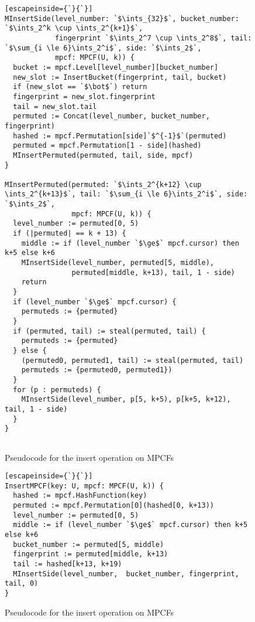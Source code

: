 \documentclass[letterpaper, 11pt]{article}
\newcommand{\ints}{\mathbb{Z}}
\begin{document}
\begin{figure}
\begin{lstlisting}[escapeinside={`}{`}]
MInsertSide(level_number: `$\ints_{32}$`, bucket_number: `$\ints_2^k \cup \ints_2^{k+1}$`,
            fingerprint `$\ints_2^7 \cup \ints_2^8$`, tail: `$\sum_{i \le 6}\ints_2^i$`, side: `$\ints_2$`,
            mpcf: MPCF(U, k)) {
  bucket := mpcf.Level[level_number][bucket_number]
  new_slot := InsertBucket(fingerprint, tail, bucket)
  if (new_slot == `$\bot$`) return
  fingerprint = new_slot.fingerprint
  tail = new_slot.tail
  permuted := Concat(level_number, bucket_number, fingerprint)
  hashed := mpcf.Permutation[side]`$^{-1}$`(permuted)
  permuted = mpcf.Permutation[1 - side](hashed)
  MInsertPermuted(permuted, tail, side, mpcf)
}

MInsertPermuted(permuted: `$\ints_2^{k+12} \cup \ints_2^{k+13}$`, tail: `$\sum_{i \le 6}\ints_2^i$`, side: `$\ints_2$`,
                mpcf: MPCF(U, k)) {
  level_number := permuted[0, 5)
  if (|permuted| == k + 13) {
    middle := if (level_number `$\ge$` mpcf.cursor) then k+5 else k+6
    MInsertSide(level_number, permuted[5, middle),
                permuted[middle, k+13), tail, 1 - side)
    return
  }
  if (level_number `$\ge$` mpcf.cursor) {
    permuteds := {permuted}
  }
  if (permuted, tail) := steal(permuted, tail) {
    permuteds := {permuted}
  } else {
    (permuted0, permuted1, tail) := steal(permuted, tail)
    permuteds := {permuted0, permuted1})
  }
  for (p : permuteds) {
    MInsertSide(level_number, p[5, k+5), p[k+5, k+12), tail, 1 - side)
  }
}


\end{lstlisting}
\caption{Pseudocode for the insert operation on MPCFs}
\end{figure}


\begin{figure}
\begin{lstlisting}[escapeinside={`}{`}]
InsertMPCF(key: U, mpcf: MPCF(U, k)) {
  hashed := mpcf.HashFunction(key)
  permuted := mpcf.Permutation[0](hashed[0, k+13))
  level_number := permuted[0, 5)
  middle := if (level_number `$\ge$` mpcf.cursor) then k+5 else k+6
  bucket_number := permuted[5, middle)
  fingerprint := permuted[middle, k+13)
  tail := hashed[k+13, k+19)
  MInsertSide(level_number,  bucket_number, fingerprint, tail, 0)
}
\end{lstlisting}
\caption{Pseudocode for the insert operation on MPCFs}
\end{figure}
\end{document}
